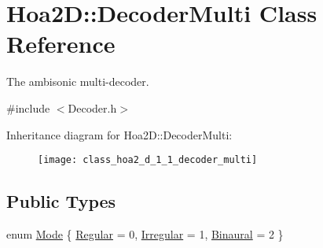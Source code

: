 \hypertarget{class_hoa2_d_1_1_decoder_multi}{\section{Hoa2\-D\-:\-:Decoder\-Multi Class Reference}
\label{class_hoa2_d_1_1_decoder_multi}
}


The ambisonic multi-\/decoder.  




{\ttfamily \#include $<$Decoder.\-h$>$}

Inheritance diagram for Hoa2\-D\-:\-:Decoder\-Multi\-:\begin{figure}[H]
\begin{center}
\leavevmode
\texttt{[image: class\_hoa2\_d\_1\_1\_decoder\_multi]}
\end{center}
\end{figure}
\subsection*{Public Types}
\begin{DoxyCompactItemize}
\item 
enum \hyperlink{class_hoa2_d_1_1_decoder_multi_a0ac23d6bd77378d9cd5ddf6e71029300}{Mode} \{ \hyperlink{class_hoa2_d_1_1_decoder_multi_a0ac23d6bd77378d9cd5ddf6e71029300abaf1a2b64008b0199ced6e486911aed2}{Regular} = 0, 
\hyperlink{class_hoa2_d_1_1_decoder_multi_a0ac23d6bd77378d9cd5ddf6e71029300afad959e312fd3402f086633b221008a3}{Irregular} = 1, 
\hyperlink{class_hoa2_d_1_1_decoder_multi_a0ac23d6bd77378d9cd5ddf6e71029300a1d1ea5f4bbb54e7062cf1c74e8ae2db0}{Binaural} = 2
 \}
\end{DoxyCompactItemize}
